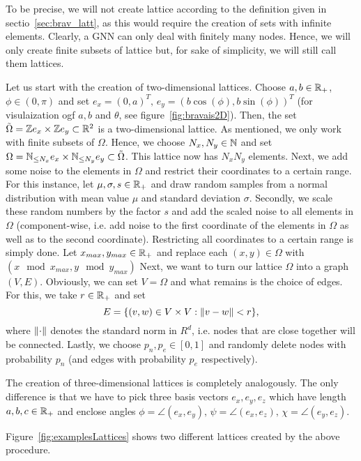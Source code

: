 \label{sec:creationLattice}

To be precise, we will not create lattice according to the definition given in sectio~\ref{sec:brav_latt}, 
as this would require the creation of sets with infinite elements. Clearly, a GNN can only deal with finitely many nodes.
Hence, we will only create finite subsets of lattice but, for sake of simplicity, we will still call them lattices.

Let us start with the creation of two-dimensional lattices.
Choose $a,b\in\mathbb{R}_+$, $\phi\in(0,\pi)$ and set
$e_x=(0,a)^T,\,e_y=(b\cos(\phi), b\sin(\phi))^T$ (for visulaization ogf $a,b$ and $\theta$, see figure~\ref{fig:bravais2D}). 
Then, the set $\tilde{\Omega}=\mathbb{Z} e_x\times\mathbb{Z} e_y\subset\mathbb{R}^2$ is a two-dimensional lattice.
As mentioned, we only work with finite subsets of $\Omega$. Hence, we choose $N_x,N_y\in\mathbb{N}$ and set $\Omega=\mathbb{N}_{\leq N_x}e_x\times\mathbb{N}_{\leq N_y}e_y\subset\tilde{\Omega}$.
This lattice now has $N_xN_y$ elements.
Next, we add some noise to the elements in $\Omega$ and restrict their coordinates to a certain range. For this instance, let $\mu,\sigma,s\in\mathbb{R}_+$ and draw random samples from
a normal distribution with mean value $\mu$ and standard deviation $\sigma$. Secondly, we scale these random numbers by the factor $s$ 
and add the scaled noise to all elements in $\Omega$ (component-wise, i.e. add noise to the first coordinate of the elements in $\Omega$ as well as to the second coordinate).
Restricting all coordinates to a certain range is simply done. Let $x_{max}, y_{max}\in\mathbb{R}_+$ and replace each $(x,y)\in\Omega$ with $(x \mod x_{max}, y \mod y_{max})$ 
Next, we want to turn our lattice $\Omega$ into a graph $(V,E)$. Obviously, we can set $V=\Omega$ and what remains is the choice of edges. For this, we take $r\in\mathbb{R}_+$ and set
\begin{equation*}
    E=\{(v, w)\in V\times V: \lVert v-w\rVert<r\},
\end{equation*}
where $\lVert\cdot\rVert$ denotes the standard norm in $R^d$, i.e. nodes that are close together will be connected.
Lastly, we choose $p_n,p_e\in[0,1]$ and randomly delete nodes with probability $p_n$ (and edges with probability $p_e$ respectively).

The creation of three-dimensional lattices is completely analogously. The only difference is that we have to pick three basis vectors $e_x,e_y,e_z$ which have length $a,b,c\in\mathbb{R}_+$ and 
enclose angles $\phi=\angle(e_x, e_y),\,\psi=\angle(e_x,e_z),\,\chi=\angle(e_y,e_z)$. 

Figure~\ref{fig:examplesLattices} shows two different lattices created by the above procedure.

